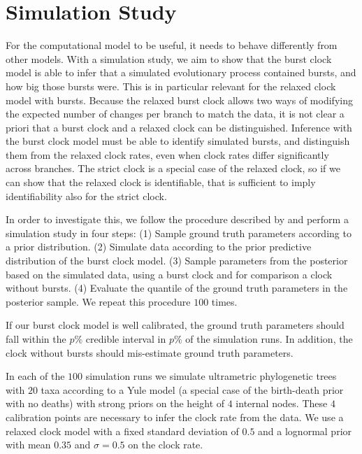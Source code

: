 \documentclass[]{rsos}%
\begin{document}
\section{Simulation Study}
\label{s:simulation}
For the computational model to be useful, it needs to behave differently from
other models. With a simulation study, we aim to show that the burst clock model is able to
infer that a simulated evolutionary process contained bursts, and how big those bursts were.
This is in particular relevant for the relaxed clock model with bursts.
Because the relaxed burst clock allows two ways of modifying the expected number
of changes per branch to match the data, it is not clear a priori that a burst
clock and a relaxed clock can be distinguished.
Inference with the burst clock model must be able to identify simulated bursts, and distinguish them from the relaxed clock rates, even when clock rates differ significantly across branches. The strict clock is a special case of the relaxed clock, so if we can show that the relaxed clock is identifiable, that is sufficient to imply identifiability also for the strict clock.

In order to investigate this,
we follow the procedure described by \textcite{cook2006validation} and perform a simulation study in four steps: (1) Sample ground truth parameters according to a prior distribution. (2) Simulate data according to the prior predictive distribution of the burst clock model. (3) Sample parameters from the posterior based on the simulated data, using a burst clock and for comparison a clock without bursts. (4) Evaluate the quantile of the ground truth parameters in the posterior sample.
We repeat this procedure $100$ times.

If our burst clock model is well calibrated, the ground truth parameters should fall within the $p\%$ credible interval in $p\%$ of the simulation runs. In addition, the clock without bursts should mis-estimate ground truth parameters.

In each of the $100$ simulation runs we simulate ultrametric phylogenetic trees with $20$ taxa according to a Yule model (a special case of the birth-death prior with no deaths) with strong priors on the height of $4$ internal nodes. These $4$ calibration points are necessary to infer the clock rate from the data. We use a relaxed clock model with a fixed standard deviation of $0.5$ and a lognormal prior with mean $0.35$ and $\sigma = 0.5$ on the clock rate.
\end{document}
